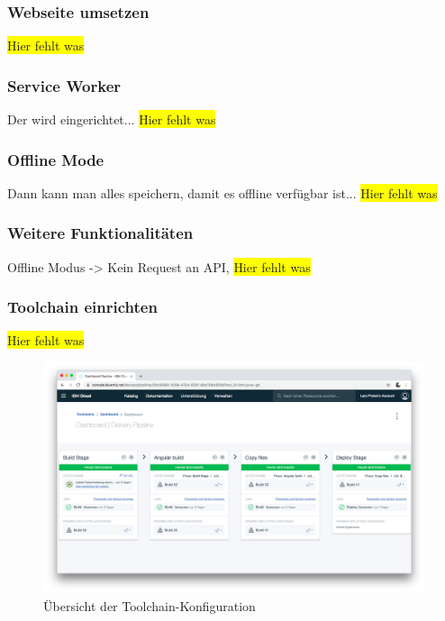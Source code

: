 \subsubsection{Webseite umsetzen}
\colorbox{yellow}{Hier fehlt was}

\subsubsection{Service Worker}
Der wird eingerichtet...
\colorbox{yellow}{Hier fehlt was}

\subsubsection{Offline Mode}
Dann kann man alles speichern, damit es offline verfügbar ist...
\colorbox{yellow}{Hier fehlt was}

\subsubsection{Weitere Funktionalitäten}
Offline Modus -> Kein Request an API,
\colorbox{yellow}{Hier fehlt was}

\subsubsection{Toolchain einrichten}
\colorbox{yellow}{Hier fehlt was}

\begin{figure}[h]
    \centering
    \includegraphics[width=\textwidth]{images/kapitel_4/toolchain_pipeline.png}
    \caption{Übersicht der Toolchain-Konfiguration}
    \label{fig:umsetzung_toolchain_pipeline_frontend}
\end{figure}

